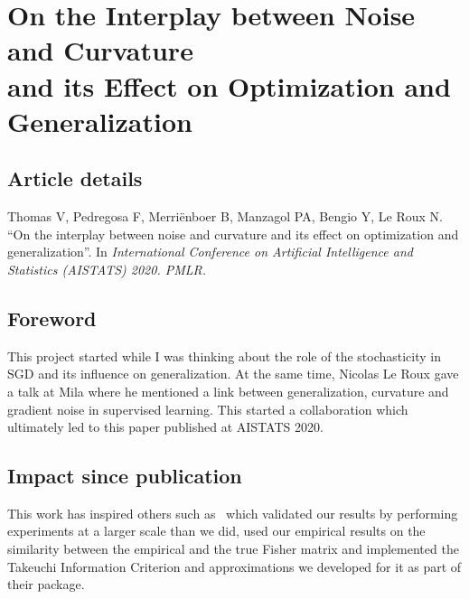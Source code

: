 





















\chapter{On the Interplay between Noise and Curvature\\ and its Effect on Optimization and Generalization}
\label{chapter:hfc}





\section*{Article details}
Thomas V, Pedregosa F, Merriënboer B, Manzagol PA, Bengio Y, Le Roux N. ``On the interplay between noise and curvature and its effect on optimization and generalization''. In \emph{International Conference on Artificial Intelligence and Statistics (AISTATS) 2020. PMLR.}

\section*{Foreword}
This project started while I was thinking about the role of the stochasticity in SGD and its influence on generalization. At the same time, Nicolas Le Roux gave a talk at Mila where he mentioned a link between generalization, curvature and gradient noise in supervised learning. This started a collaboration which ultimately led to this paper published at AISTATS 2020. 

\section*{Impact since publication}
This work has inspired others such as~\citet{naganuma2022takeuchis} which validated our results by performing experiments at a larger scale than we did, \citet{rame2022fishr} used our empirical results on the similarity between the empirical and the true Fisher matrix and \citet{schneider2021cockpit} implemented the Takeuchi Information Criterion and approximations we developed for it as part of their package.




